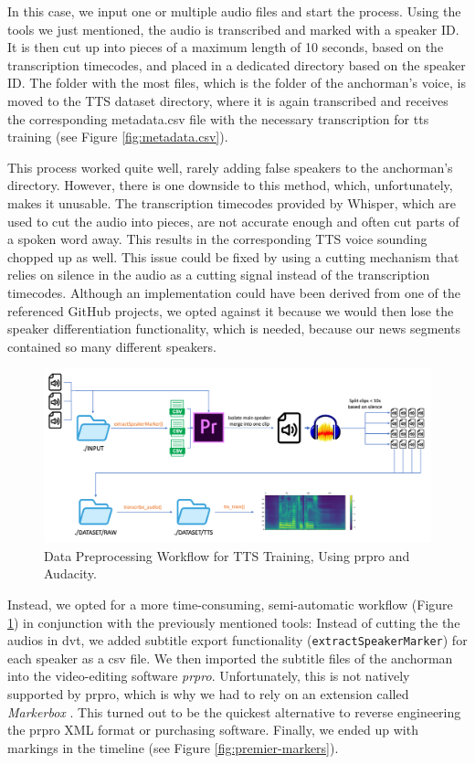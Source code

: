\documentclass[
  a4paper,  %
  twoside,  %
  bibliography=totoc,
  headsepline,
  cleardoublepage=empty,
  parskip=half,
  draft=false
]{scrbook}
\begin{document}
In this case, we input one or multiple audio files and start the process. Using the tools we just mentioned, the audio is transcribed and marked with a speaker ID.
It is then cut up into pieces of a maximum length of 10 seconds, based on the transcription timecodes, and placed in a dedicated directory based on the speaker ID. The folder with the most files, which is the folder of the anchorman's voice, is moved to the TTS dataset directory, where it is again transcribed and receives the corresponding metadata.csv file with the necessary transcription for \gls{tts} training (see Figure \ref{fig:metadata.csv}).

This process worked quite well, rarely adding false speakers to the anchorman's directory. However, there is one downside to this method, which, unfortunately, makes it unusable. The transcription timecodes provided by Whisper, which are used to cut the audio into pieces, are not accurate enough and often cut parts of a spoken word away. This results in the corresponding TTS voice sounding chopped up as well. This issue could be fixed by using a cutting mechanism that relies on silence in the audio as a cutting signal instead of the transcription timecodes. Although an implementation could have been derived from one of the referenced GitHub projects, we opted against it because we would then lose the speaker differentiation functionality, which is needed, because our news segments contained so many different speakers.

\begin{figure}[h]
  \centering
  \includegraphics[width=1\textwidth]{./graphics/tts/tts prpro.png}
  \caption{Data Preprocessing Workflow for TTS Training, Using \gls{prpro} and Audacity.}
  \label{fig:dvt-tts-wf}
\end{figure}

Instead, we opted for a more time-consuming, semi-automatic workflow (Figure \ref{fig:dvt-tts-wf}) in conjunction with the previously mentioned tools: Instead of cutting the the audios in \gls{dvt}, we added subtitle export functionality (\verb|extractSpeakerMarker|) for each speaker as a csv file. We then imported the subtitle files of the anchorman into the video-editing software \textit{\gls{prpro}}. Unfortunately, this is not natively supported by \gls{prpro}, which is why we had to rely on an extension called \textit{Markerbox} \cite{montgomeryMARKERBOXFreeMarker}. This turned out to be the quickest alternative to reverse engineering the \gls{prpro} XML format or purchasing software. Finally, we ended up with markings in the timeline (see Figure \ref{fig:premier-markers}). 
\end{document}
